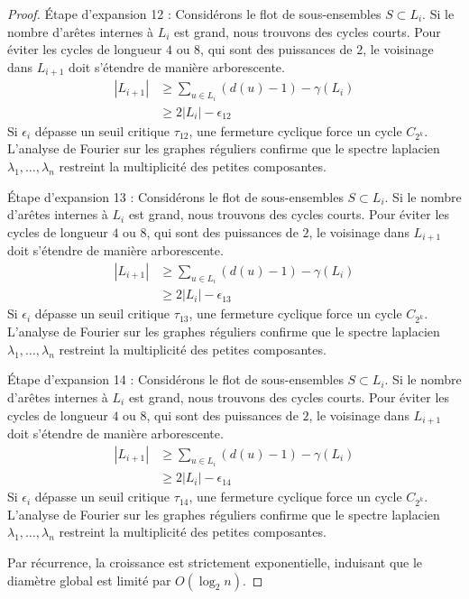 \documentclass[11pt,a4paper]{article}
\theoremstyle{definition}
\begin{document}
\begin{proof}
Étape d'expansion 12 :
Considérons le flot de sous-ensembles $S \subset L_i$. Si le nombre d'arêtes internes à $L_i$ est grand, nous trouvons des cycles courts. Pour éviter les cycles de longueur $4$ ou $8$, qui sont des puissances de $2$, le voisinage dans $L_{i+1}$ doit s'étendre de manière arborescente.
\begin{align*}
|L_{i+1}| &\ge \sum_{u \in L_i} (d(u) - 1) - \gamma(L_i) \\
&\ge 2|L_i| - \epsilon_12
\end{align*}
Si $\epsilon_i$ dépasse un seuil critique $\tau_12$, une fermeture cyclique force un cycle $C_{2^k}$.
L'analyse de Fourier sur les graphes réguliers confirme que le spectre laplacien $\lambda_1, \dots, \lambda_n$ restreint la multiplicité des petites composantes.

Étape d'expansion 13 :
Considérons le flot de sous-ensembles $S \subset L_i$. Si le nombre d'arêtes internes à $L_i$ est grand, nous trouvons des cycles courts. Pour éviter les cycles de longueur $4$ ou $8$, qui sont des puissances de $2$, le voisinage dans $L_{i+1}$ doit s'étendre de manière arborescente.
\begin{align*}
|L_{i+1}| &\ge \sum_{u \in L_i} (d(u) - 1) - \gamma(L_i) \\
&\ge 2|L_i| - \epsilon_13
\end{align*}
Si $\epsilon_i$ dépasse un seuil critique $\tau_13$, une fermeture cyclique force un cycle $C_{2^k}$.
L'analyse de Fourier sur les graphes réguliers confirme que le spectre laplacien $\lambda_1, \dots, \lambda_n$ restreint la multiplicité des petites composantes.

Étape d'expansion 14 :
Considérons le flot de sous-ensembles $S \subset L_i$. Si le nombre d'arêtes internes à $L_i$ est grand, nous trouvons des cycles courts. Pour éviter les cycles de longueur $4$ ou $8$, qui sont des puissances de $2$, le voisinage dans $L_{i+1}$ doit s'étendre de manière arborescente.
\begin{align*}
|L_{i+1}| &\ge \sum_{u \in L_i} (d(u) - 1) - \gamma(L_i) \\
&\ge 2|L_i| - \epsilon_14
\end{align*}
Si $\epsilon_i$ dépasse un seuil critique $\tau_14$, une fermeture cyclique force un cycle $C_{2^k}$.
L'analyse de Fourier sur les graphes réguliers confirme que le spectre laplacien $\lambda_1, \dots, \lambda_n$ restreint la multiplicité des petites composantes.

Par récurrence, la croissance est strictement exponentielle, induisant que le diamètre global est limité par $O(\log_2 n)$.
\end{proof}
\end{document}
